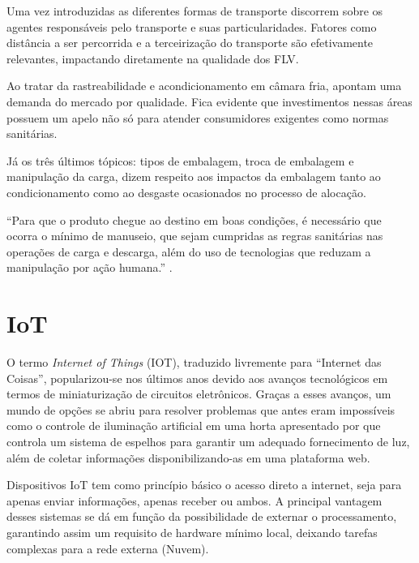 Uma vez introduzidas as diferentes formas de transporte  discorrem sobre os agentes responsáveis pelo transporte e suas particularidades. Fatores como distância a ser percorrida e a terceirização do transporte são efetivamente relevantes, impactando diretamente na qualidade dos FLV.

Ao tratar da rastreabilidade e acondicionamento em câmara fria,  apontam uma demanda do mercado por qualidade. Fica evidente que investimentos nessas áreas possuem um apelo não só para atender consumidores exigentes como normas sanitárias.

Já os três últimos tópicos: tipos de embalagem, troca de embalagem e manipulação da carga, dizem respeito aos impactos da embalagem tanto ao condicionamento como ao desgaste ocasionados no processo de alocação.

``Para que o produto chegue ao destino em boas condições, é necessário que ocorra o mínimo de manuseio, que sejam cumpridas as regras sanitárias nas operações de carga e descarga, além do uso de tecnologias que reduzam a manipulação por ação humana.'' \cite[p.~16]{Aliotte2022}.





\section{IoT}
O termo \textit{Internet of Things} (IOT), traduzido livremente para ``Internet das Coisas'', popularizou-se nos últimos anos devido aos avanços tecnológicos em termos de miniaturização de circuitos eletrônicos. Graças a esses avanços, um mundo de opções se abriu para resolver problemas que antes eram impossíveis como o controle de iluminação artificial em uma horta apresentado por  que controla um sistema de espelhos para garantir um adequado fornecimento de luz, além de coletar informações disponibilizando-as em uma plataforma web.

Dispositivos IoT tem como princípio básico o acesso direto a internet, seja para apenas enviar informações, apenas receber ou ambos. A principal vantagem desses sistemas se dá em função da possibilidade de externar o processamento, garantindo assim um requisito de hardware mínimo local, deixando tarefas complexas para a rede externa (Nuvem).  

